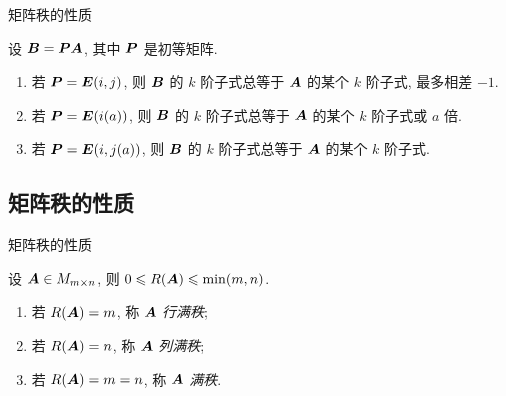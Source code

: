 \begin{frame}{矩阵秩的性质}
	\onslide<+->
	\begin{proof*}
		设 ${\boldsymbol{B}}={\boldsymbol{P}}{\boldsymbol{A}}$, 其中 ${\boldsymbol{P}}$ 是初等矩阵.
		\begin{enumerate}
			\item 若 ${\boldsymbol{P}}={\boldsymbol{E}}(i,j)$, 则 ${\boldsymbol{B}}$ 的 $k$ 阶子式总等于 ${\boldsymbol{A}}$ 的某个 $k$ 阶子式, 最多相差 $-1$.
			\item 若 ${\boldsymbol{P}}={\boldsymbol{E}}(i(a))$, 则 ${\boldsymbol{B}}$ 的 $k$ 阶子式总等于 ${\boldsymbol{A}}$ 的某个 $k$ 阶子式或 $a$ 倍.
			\item 若 ${\boldsymbol{P}}={\boldsymbol{E}}(i,j(a))$, 则 ${\boldsymbol{B}}$ 的 $k$ 阶子式总等于 ${\boldsymbol{A}}$ 的某个 $k$ 阶子式.
		\end{enumerate}


	\end{proof*}
\end{frame}


\subsection{矩阵秩的性质}

\begin{frame}{矩阵秩的性质}
	\onslide<+->
	\begin{proposition}
		设 ${\boldsymbol{A}}\in M_{m\times n}$, 则 $0\leqslant R({\boldsymbol{A}})\leqslant \min(m,n)$.
	\end{proposition}
	\onslide<+->
	\begin{definition}[满秩]
		\begin{enumerate}
			\item 若 $R({\boldsymbol{A}})=m$, 称 ${\boldsymbol{A}}$ \emph{行满秩};
			\item 若 $R({\boldsymbol{A}})=n$, 称 ${\boldsymbol{A}}$ \emph{列满秩};
			\item 若 $R({\boldsymbol{A}})=m=n$, 称 ${\boldsymbol{A}}$ \emph{满秩}.
		\end{enumerate}
	\end{definition}
\end{frame}



